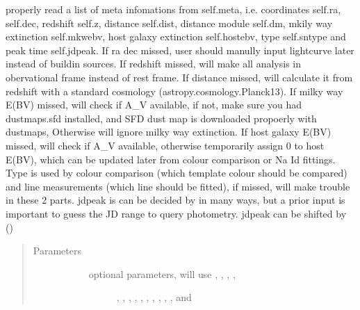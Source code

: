 \documentclass[letterpaper,10pt,english]{sphinxmanual}
\begin{document}
\begin{fulllineitems}
\begin{fulllineitems}
\label{\detokenize{generated/sdapy.snerun.snelist.parse_meta_all:sdapy.snerun.snelist.parse_meta_all}}
properly read a list of meta infomations from self.meta, i.e. coordinates self.ra, self.dec,
redshift self.z, distance self.dist, distance module self.dm, mkily way extinction self.mkwebv,
host galaxy extinction self.hostebv, type self.sntype and peak time self.jdpeak.
If ra dec missed, user should manully input lightcurve later instead of build\sphinxhyphen{}in sources.
If redshift missed, will make all analysis in obervational frame instead of rest frame.
If distance missed, will calculate it from redshift with a standard cosmology (astropy.cosmology.Planck13).
If milky way E(B\sphinxhyphen{}V) missed, will check if A\_V available, if not, make sure you had dustmaps.sfd installed,
and SFD dust map is downloaded propoerly with dustmaps, Otherwise will ignore milky way extinction.
If host galaxy E(B\sphinxhyphen{}V) missed, will check if A\_V available, otherwise temporarily assign 0 to host E(B\sphinxhyphen{}V),
which can be updated later from colour comparison or Na Id fittings.
Type is used by colour comparison (which template colour should be compared) and line measurements 
(which line should be fitted), if missed, will make trouble in these 2 parts.
jdpeak is can be decided by  in many ways, but a prior input is important to guess the JD range
to query photometry. jdpeak can be shifted by  
()
\begin{quote}\begin{description}
\item[{Parameters}] \leavevmode\begin{description}
\item[{}] \leavevmode{[}\sphinxtitleref{Keyword Arguments}{]}\begin{description}
\item[{optional parameters, will use  ,  ,  ,  , }] \leavevmode
{},  ,  ,  ,  , 
,  ,  ,  ,  , and  


\end{description}
\end{description}
\end{description}
\end{quote}
\end{fulllineitems}
\end{fulllineitems}
\end{document}
